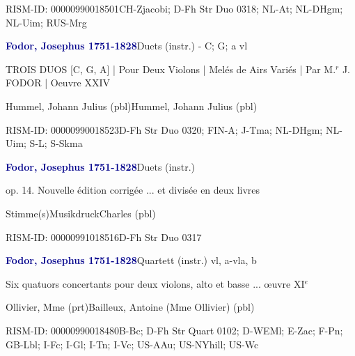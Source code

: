 \documentclass[twocolumn]{book}
\begin{document}
\par RISM-ID: 00000990018501\newline CH-Zjacobi; D-Fh  Str Duo 0318; NL-At; NL-DHgm; NL-Uim; RUS-Mrg
\par \vspace{7pt} \textcolor{darkblue}{\textbf{Fodor, Josephus  1751-1828}}\hfillplus{\textbf{[272]}}\newline Duets (instr.) - C; G; a vl
\par \begin{itshape}TROIS DUOS [C, G, A] | Pour Deux Violons | Melés de Airs Variés | Par  M.$^r$ J. FODOR | Oeuvre XXIV\end{itshape} \newline Hummel, Johann Julius  (pbl)\newline Hummel, Johann Julius  (pbl)
\par RISM-ID: 00000990018523\newline D-Fh  Str Duo 0320; FIN-A; J-Tma; NL-DHgm; NL-Uim; S-L; S-Skma
\par \vspace{7pt} \textcolor{darkblue}{\textbf{Fodor, Josephus  1751-1828}}\hfillplus{\textbf{[273]}}\newline Duets (instr.)
\par \begin{itshape}op. 14. Nouvelle édition corrigée ... et divisée en deux livres\end{itshape} 
\par \textcolor{darkblue}{}  Stimme(s)\newline Musikdruck\newline Charles  (pbl)
\par RISM-ID: 00000991018516\newline D-Fh  Str Duo 0317
\par \vspace{7pt} \textcolor{darkblue}{\textbf{Fodor, Josephus  1751-1828}}\hfillplus{\textbf{[274]}}\newline Quartett (instr.) vl, a-vla, b
\par \begin{itshape}Six quatuors concertants pour deux violons, alto et basse ... œuvre XI$^e$\end{itshape} \newline Ollivier, Mme  (prt)\newline Bailleux, Antoine (Mme Ollivier)  (pbl)
\par RISM-ID: 00000990018480\newline B-Bc; D-Fh  Str Quart 0102; D-WEMl; E-Zac; F-Pn; GB-Lbl; I-Fc; I-Gl; I-Tn; I-Vc; US-AAu; US-NYhill; US-Wc
\end{document}
